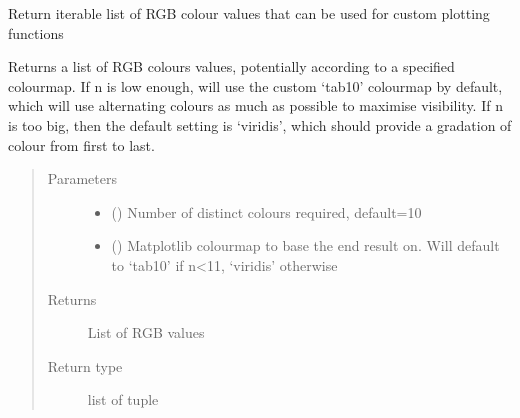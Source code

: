 \documentclass[letterpaper,10pt,english]{sphinxmanual}
\begin{document}
\begin{fulllineitems}
\label{\detokenize{_autosummary/tools.plotting.get_plot_colours:tools.plotting.get_plot_colours}}
\sphinxAtStartPar
Return iterable list of RGB colour values that can be used for custom plotting functions

\sphinxAtStartPar
Returns a list of RGB colours values, potentially according to a specified colourmap. If n is low enough, will use
the custom ‘tab10’ colourmap by default, which will use alternating colours as much as possible to maximise
visibility. If n is too big, then the default setting is ‘viridis’, which should provide a gradation of colour from
first to last.
\begin{quote}\begin{description}
\item[{Parameters}] \leavevmode\begin{itemize}
\item {} 
\sphinxAtStartPar
{} (\sphinxstyleliteralemphasis{\sphinxupquote{, }}) \textendash{} Number of distinct colours required, default=10

\item {} 
\sphinxAtStartPar
{} () \textendash{} Matplotlib colourmap to base the end result on. Will default to ‘tab10’ if n\textless{}11, ‘viridis’ otherwise

\end{itemize}

\item[{Returns}] \leavevmode
\sphinxAtStartPar
{} \textendash{} List of RGB values

\item[{Return type}] \leavevmode
\sphinxAtStartPar
list of tuple

\end{description}\end{quote}

\end{fulllineitems}
\end{document}
